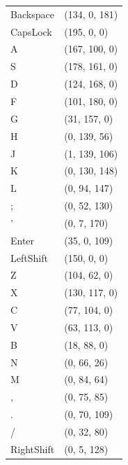 \documentclass{report}
\begin{document}
\begin{supertabular}{ll}
	Backspace & (134, 0, 181)\\
	CapsLock & (195, 0, 0)\\
	A & (167, 100, 0)\\
	S & (178, 161, 0)\\
	D & (124, 168, 0)\\
	F & (101, 180, 0)\\
	G & (31, 157, 0)\\
	H & (0, 139, 56)\\
	J & (1, 139, 106)\\
	K & (0, 130, 148)\\
	L & (0, 94, 147)\\
	; & (0, 52, 130)\\
	' & (0, 7, 170)\\
	Enter & (35, 0, 109)\\
	LeftShift & (150, 0, 0)\\
	Z & (104, 62, 0)\\
	X & (130, 117, 0)\\
	C & (77, 104, 0)\\
	V & (63, 113, 0)\\
	B & (18, 88, 0)\\
	N & (0, 66, 26)\\
	M & (0, 84, 64)\\
	, & (0, 75, 85)\\
	. & (0, 70, 109)\\
	/ & (0, 32, 80)\\
	RightShift & (0, 5, 128)\\

\end{supertabular}

\onecolumn
\end{document}
